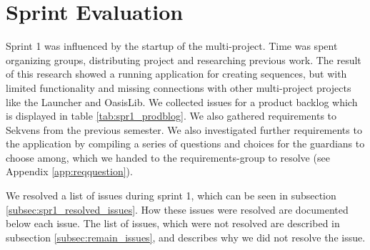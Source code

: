 \section{Sprint Evaluation}\label{sec:spr1_spreval}
Sprint 1 was influenced by the startup of the multi-project. Time was spent organizing groups, distributing project and researching previous work. The result of this research showed a running application for creating sequences, but with limited functionality and missing connections with other multi-project projects like the Launcher and OasisLib. We collected issues for a product backlog which is displayed in table \ref{tab:spr1_prodblog}. We also gathered requirements to Sekvens from the previous semester. We also investigated further requirements to the application by compiling a series of questions and choices for the guardians to choose among, which we handed to the requirements-group to resolve (see Appendix \ref{app:reqquestion}). 

We resolved a list of issues during sprint 1, which can be seen in subsection \ref{subsec:spr1_resolved_issues}. How these issues were resolved are documented below each issue. The list of issues, which were not resolved are described in subsection \ref{subsec:remain_issues}, and describes why we did not resolve the issue.